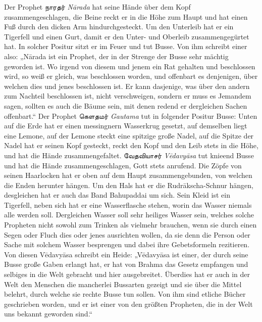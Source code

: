 \documentclass{article}
\newcommand{\TamilText}[1]{\texttamil{#1}}
\newcommand{\tam}[1]{\TamilText{#1}}
\begin{document}
Der Prophet \tam{நாரதர்} \emph{N\={a}rada} hat seine Hände über dem Kopf zusammengeschlagen, die Beine reckt er in die Höhe zum Haupt und hat einen Fuß durch den dicken Arm hindurchgesteckt. Um den Unterleib hat er ein Tigerfell und einen Gurt, damit er den Unter- und Oberleib zusammengegürtet hat. In solcher Positur sitzt er im Feuer und tut Busse. Von ihm schreibt einer also: „N\={a}rada ist ein Prophet, der in der Strenge der Busse sehr mächtig geworden ist. Wo irgend von diesem und jenem ein Rat gehalten und beschlossen wird, so weiß er gleich, was beschlossen worden, und offenbart es denjenigen, über welchen dies und jenes beschlossen ist. Er kann dasjenige, was über den andern zum Nachteil beschlossen ist, nicht verschweigen, sondern er muss es Jemandem sagen, sollten es auch die Bäume sein, mit denen redend er dergleichen Sachen offenbart.“ Der Prophet \tam{கெளதமர்} \emph{Gautama} tut in folgender Positur Busse: Unten auf die Erde hat er einen messingnern Wasserkrug gesetzt, auf demselben liegt eine Lemone, auf der Lemone steckt eine spitzige große Nadel, auf die Spitze der Nadel hat er seinen Kopf gesteckt, reckt den Kopf und den Leib stets in die Höhe, und hat die Hände zusammengefaltet. \tam{வேதவியாசர்} \emph{V\={e}davy\={a}sa} tut knieend Busse und hat die Hände zusammengeschlagen, Gott stets anrufend. Die Zöpfe von seinen Haarlocken hat er oben auf dem Haupt zusammengebunden, von welchen die Enden herunter hängen. Um den Hals hat er die Rudr\={a}kscha-Schnur hängen, desgleichen hat er auch das Band Bahupaddai um sich. Sein Kleid ist ein Tigerfell, neben sich hat er eine Wasserflasche stehen, worin das Wasser niemals alle werden soll. Dergleichen Wasser soll sehr heiliges Wasser sein, welches solche Propheten nicht sowohl zum Trinken als vielmehr brauchen, wenn sie durch einen Segen oder Fluch dies oder jenes ausrichten wollen, da sie denn die Person oder Sache mit solchem Wasser besprengen und dabei ihre Gebetsformeln rezitieren. Von diesen V\={e}davy\={a}sa schreibt ein Heide: „V\={e}davy\={a}sa ist einer, der durch seine Busse große Gaben erlangt hat, er hat von Brahma das Gesetz empfangen und selbiges in die Welt gebracht und hier ausgebreitet. Überdies hat er auch in der Welt den Menschen die mancherlei Bussarten gezeigt und sie über die Mittel belehrt, durch welche sie rechte Busse tun sollen. Von ihm sind etliche Bücher geschrieben worden, und er ist einer von den größten Propheten, die in der Welt uns bekannt geworden sind.“
\end{document}
